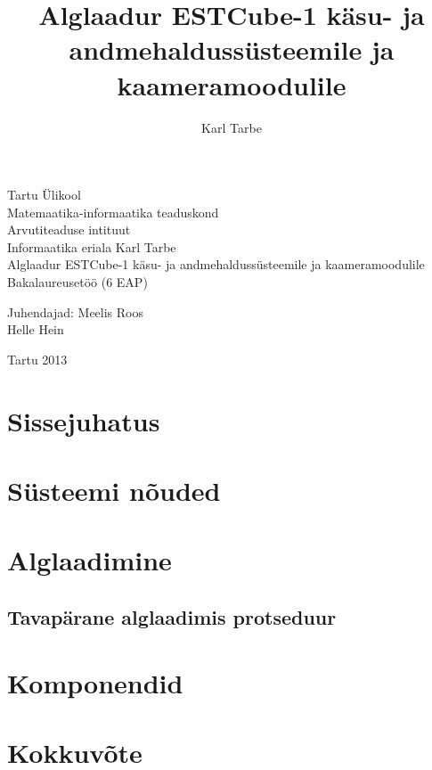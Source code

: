 \documentclass[12pt,a4paper]{article}
\title{Alglaadur ESTCube-1 käsu- ja andmehaldussüsteemile ja kaameramoodulile}
\author{Karl Tarbe}
\begin{document}
\begin{titlepage}
\begin{center}
Tartu Ülikool\\
Matemaatika-informaatika teaduskond\\
Arvutiteaduse intituut\\
Informaatika eriala
\vfill
Karl Tarbe\\[1cm]
Alglaadur ESTCube-1 käsu- ja andmehaldussüsteemile ja kaameramoodulile\\[4mm]
Bakalaureusetöö (6 EAP)
\vspace{2cm}
\begin{flushright}
	Juhendajad: Meelis Roos\\
	Helle Hein
\end{flushright}
\vfill
Tartu 2013
\end{center}
\end{titlepage}

\tableofcontents

\section{Sissejuhatus}
\section{Süsteemi nõuded}
\section{Alglaadimine}
\subsection{Tavapärane alglaadimis protseduur}


\section{Komponendid}
\section{Kokkuvõte}
\end{document}

